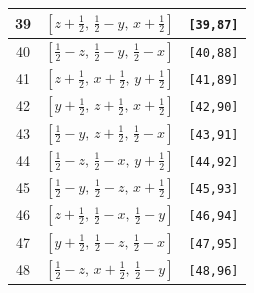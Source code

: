 \documentclass[fleqn,8pt]{jsarticle}
\begin{document}
\begin{longtable}{ccc}
39 & $\left[ z + \frac{1}{2},\, \frac{1}{2} - y,\, x + \frac{1}{2} \right]$ & {\tt [39,87]} \\ \hline
40 & $\left[ \frac{1}{2} - z,\, \frac{1}{2} - y,\, \frac{1}{2} - x \right]$ & {\tt [40,88]} \\ \hline
41 & $\left[ z + \frac{1}{2},\, x + \frac{1}{2},\, y + \frac{1}{2} \right]$ & {\tt [41,89]} \\ \hline
42 & $\left[ y + \frac{1}{2},\, z + \frac{1}{2},\, x + \frac{1}{2} \right]$ & {\tt [42,90]} \\ \hline
43 & $\left[ \frac{1}{2} - y,\, z + \frac{1}{2},\, \frac{1}{2} - x \right]$ & {\tt [43,91]} \\ \hline
44 & $\left[ \frac{1}{2} - z,\, \frac{1}{2} - x,\, y + \frac{1}{2} \right]$ & {\tt [44,92]} \\ \hline
45 & $\left[ \frac{1}{2} - y,\, \frac{1}{2} - z,\, x + \frac{1}{2} \right]$ & {\tt [45,93]} \\ \hline
46 & $\left[ z + \frac{1}{2},\, \frac{1}{2} - x,\, \frac{1}{2} - y \right]$ & {\tt [46,94]} \\ \hline
47 & $\left[ y + \frac{1}{2},\, \frac{1}{2} - z,\, \frac{1}{2} - x \right]$ & {\tt [47,95]} \\ \hline
48 & $\left[ \frac{1}{2} - z,\, x + \frac{1}{2},\, \frac{1}{2} - y \right]$ & {\tt [48,96]} \\
\end{longtable}
\end{document}
